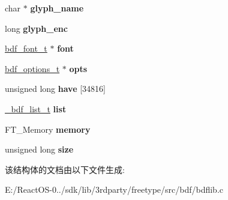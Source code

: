 \begin{DoxyCompactItemize}
\mbox{\label{struct__bdf__parse__t___a560d3bcbd19cb55f00d1d746bbe0e14e}} 
char $\ast$ {\bfseries glyph\+\_\+name}
\item 
\mbox{\label{struct__bdf__parse__t___a97a41007b94e592c2a93e8ad71c6b108}} 
long {\bfseries glyph\+\_\+enc}
\item 
\mbox{\label{struct__bdf__parse__t___ae6adc34a634532de3f66b9c71d888c1b}} 
\hyperlink{structbdf__font__t__}{bdf\+\_\+font\+\_\+t} $\ast$ {\bfseries font}
\item 
\mbox{\label{struct__bdf__parse__t___a93d86e0ca12102ea7c9716f5d3b8892c}} 
\hyperlink{structbdf__options__t__}{bdf\+\_\+options\+\_\+t} $\ast$ {\bfseries opts}
\item 
\mbox{\label{struct__bdf__parse__t___a06049fd4ceea450fa761d9323100ab0c}} 
unsigned long {\bfseries have} \mbox{[}34816\mbox{]}
\item 
\mbox{\label{struct__bdf__parse__t___ae3119dc8be798b09cb9a7590b775e664}} 
\hyperlink{struct__bdf__list__t__}{\+\_\+bdf\+\_\+list\+\_\+t} {\bfseries list}
\item 
\mbox{\label{struct__bdf__parse__t___a9920b46659932e5f73617ad63a7c1706}} 
F\+T\+\_\+\+Memory {\bfseries memory}
\item 
\mbox{\label{struct__bdf__parse__t___ae38a878bd67b502b306c7db195d8fa5b}} 
unsigned long {\bfseries size}
\end{DoxyCompactItemize}


该结构体的文档由以下文件生成\+:\begin{DoxyCompactItemize}
\item 
E\+:/\+React\+O\+S-\/0../sdk/lib/3rdparty/freetype/src/bdf/bdflib.\+c\end{DoxyCompactItemize}
